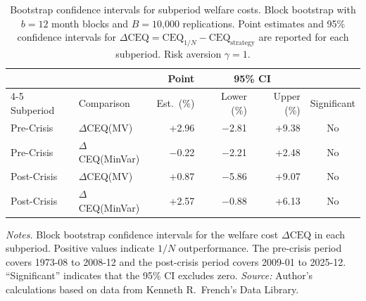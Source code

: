 \begin{table}[htbp]
  \centering
  \caption[Bootstrap confidence intervals for subperiod welfare costs]{Bootstrap confidence intervals for subperiod welfare costs. Block bootstrap with $b=12$ month blocks and $B=\text{10,000}$ replications. Point estimates and 95\% confidence intervals for $\Delta\text{CEQ} = \text{CEQ}_{1/N} - \text{CEQ}_{\text{strategy}}$ are reported for each subperiod. Risk aversion $\gamma=1$.}
  \label{tab:subperiod_bootstrap}
  \small
  \begin{tabular}{l l r r r c}
    \toprule
    & & Point & \multicolumn{2}{c}{95\% CI} & \\
    \cmidrule(lr){4-5}
    Subperiod & Comparison & Est.\ (\%) & Lower (\%) & Upper (\%) & Significant \\
    \midrule
    Pre-Crisis & $\Delta$CEQ(MV) & +2.96 & $-$2.81 & +9.38 & No \\
    Pre-Crisis & $\Delta$CEQ(MinVar) & $-$0.22 & $-$2.21 & +2.48 & No \\
    \addlinespace
    Post-Crisis & $\Delta$CEQ(MV) & +0.87 & $-$5.86 & +9.07 & No \\
    Post-Crisis & $\Delta$CEQ(MinVar) & +2.57 & $-$0.88 & +6.13 & No \\
    \bottomrule
  \end{tabular}

  \smallskip
  \begin{minipage}{\textwidth}
    \footnotesize
    \textit{Notes.} Block bootstrap confidence intervals for the welfare cost $\Delta\text{CEQ}$ in each subperiod. Positive values indicate $1/N$ outperformance. The pre-crisis period covers 1973-08 to 2008-12 and the post-crisis period covers 2009-01 to 2025-12. ``Significant'' indicates that the 95\% CI excludes zero.
    \textit{Source:} Author's calculations based on data from Kenneth R.\ French's Data Library.
  \end{minipage}
\end{table}
